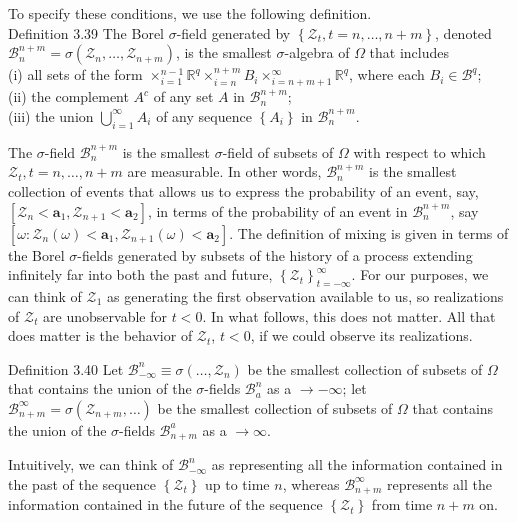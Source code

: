 \documentclass[10pt]{article}
\begin{document}
To specify these conditions, we use the following definition.\\
Definition 3.39 The Borel $\sigma$-field generated by $\left\{\mathcal{Z}_{t}, t=n, \ldots, n+m\right\}$, denoted $\mathcal{B}_{n}^{n+m}=\sigma\left(\mathcal{Z}_{n}, \ldots, \mathcal{Z}_{n+m}\right)$, is the smallest $\sigma$-algebra of $\Omega$ that includes\\
(i) all sets of the form $\times_{i=1}^{n-1} \mathbb{R}^{q} \times_{i=n}^{n+m} B_{i} \times_{i=n+m+1}^{\infty} \mathbb{R}^{q}$, where each $B_{i} \in \mathcal{B}^{q}$;\\
(ii) the complement $A^{c}$ of any set $A$ in $\mathcal{B}_{n}^{n+m}$;\\
(iii) the union $\bigcup_{i=1}^{\infty} A_{i}$ of any sequence $\left\{A_{i}\right\}$ in $\mathcal{B}_{n}^{n+m}$.

The $\sigma$-field $\mathcal{B}_{n}^{n+m}$ is the smallest $\sigma$-field of subsets of $\Omega$ with respect to which $\mathcal{Z}_{t}, t=n, \ldots, n+m$ are measurable. In other words, $\mathcal{B}_{n}^{n+m}$ is the smallest collection of events that allows us to express the probability of an event, say, $\left[\mathcal{Z}_{n}<\mathbf{a}_{1}, \mathcal{Z}_{n+1}<\mathbf{a}_{2}\right]$, in terms of the probability of an event in $\mathcal{B}_{n}^{n+m}$, say $\left[\omega: \mathcal{Z}_{n}(\omega)<\mathbf{a}_{1}, \mathcal{Z}_{n+1}(\omega)<\mathbf{a}_{2}\right]$. The definition of mixing is given in terms of the Borel $\sigma$-fields generated by subsets of the history of a process extending infinitely far into both the past and future, $\left\{\mathcal{Z}_{t}\right\}_{t=-\infty}^{\infty}$. For our purposes, we can think of $\mathcal{Z}_{1}$ as generating the first observation available to us, so realizations of $\mathcal{Z}_{t}$ are unobservable for $t<0$. In what follows, this does not matter. All that does matter is the behavior of $\boldsymbol{\mathcal { Z }}_{t}$, $t<0$, if we could observe its realizations.

Definition 3.40 Let $\mathcal{B}_{-\infty}^{n} \equiv \sigma\left(\ldots, \mathcal{Z}_{n}\right)$ be the smallest collection of subsets of $\Omega$ that contains the union of the $\sigma$-fields $\mathcal{B}_{a}^{n}$ as a $\rightarrow-\infty$; let $\mathcal{B}_{n+m}^{\infty}=\sigma\left(\mathcal{Z}_{n+m}, \ldots\right)$ be the smallest collection of subsets of $\Omega$ that contains the union of the $\sigma$-fields $\mathcal{B}_{n+m}^{a}$ as a $\rightarrow \infty$.

Intuitively, we can think of $\mathcal{B}_{-\infty}^{n}$ as representing all the information contained in the past of the sequence $\left\{\mathcal{Z}_{t}\right\}$ up to time $n$, whereas $\mathcal{B}_{n+m}^{\infty}$ represents all the information contained in the future of the sequence $\left\{\mathcal{Z}_{t}\right\}$ from time $n+m$ on.
\end{document}
